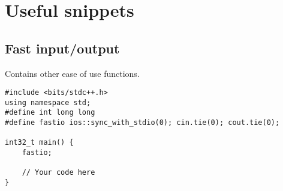 \documentclass{cpnote}
\begin{document}
\section{Useful snippets}
\subsection{Fast input/output}
Contains other ease of use functions.
\begin{verbatim}
#include <bits/stdc++.h>
using namespace std;
#define int long long
#define fastio ios::sync_with_stdio(0); cin.tie(0); cout.tie(0);

int32_t main() {
    fastio;

    // Your code here
}
\end{verbatim}
\end{document}
